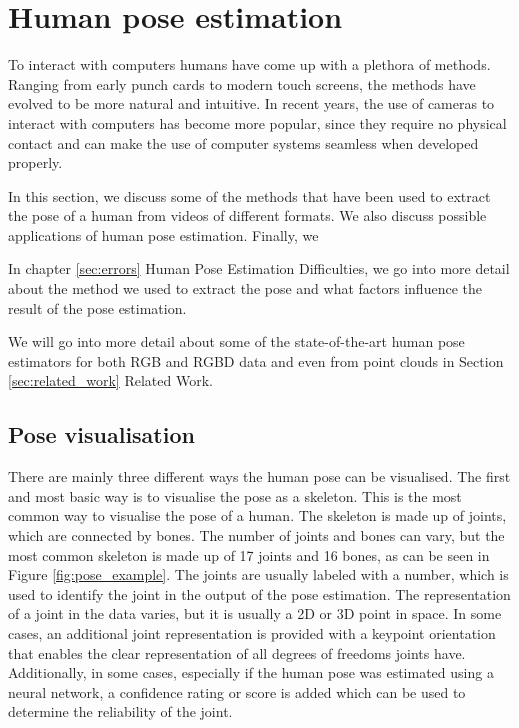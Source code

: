 \section{Human pose estimation}

To interact with computers humans have come up with a plethora of methods. Ranging from early punch cards to modern touch screens, the methods have evolved to be more natural and intuitive. In recent years, the use of cameras to interact with computers has become more popular, since they require no physical contact and can make the use of computer systems seamless when developed properly.

In this section, we discuss some of the methods that have been used to extract the pose of a human from videos of different formats. We also discuss possible applications of human pose estimation. Finally, we 

In chapter \ref{sec:errors} Human Pose Estimation Difficulties, we go into more detail about the method we used to extract the pose and what factors influence the result of the pose estimation.

We will go into more detail about some of the state-of-the-art human pose estimators for both RGB and RGBD data and even from point clouds in Section \ref{sec:related_work} Related Work.

\subsection{Pose visualisation}

There are mainly three different ways the human pose can be visualised. The first and most basic way is to visualise the pose as a skeleton. This is the most common way to visualise the pose of a human. The skeleton is made up of joints, which are connected by bones. The number of joints and bones can vary, but the most common skeleton is made up of 17 joints and 16 bones, as can be seen in Figure \ref{fig:pose_example}. The joints are usually labeled with a number, which is used to identify the joint in the output of the pose estimation. The representation of a joint in the data varies, but it is usually a 2D or 3D point in space. In some cases, an additional joint representation is provided with a keypoint orientation that enables the clear representation of all degrees of freedoms joints have\cite{KeypointOrientation}. Additionally, in some cases, especially if the human pose was estimated using a neural network, a confidence rating or score is added which can be used to determine the reliability of the joint.

